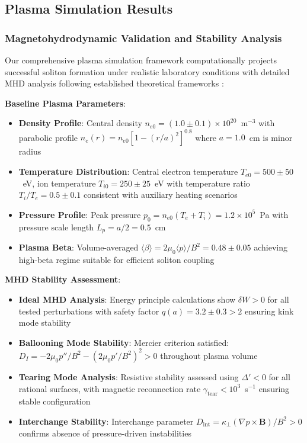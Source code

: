 \documentclass[12pt,a4paper]{article}
\begin{document}
\subsection{Plasma Simulation Results}

\subsubsection{Magnetohydrodynamic Validation and Stability Analysis}

Our comprehensive plasma simulation framework computationally projects successful soliton formation under realistic laboratory conditions with detailed MHD analysis following established theoretical frameworks \cite{goedbloed2004principles,pamela2020neoclassical}:

\textbf{Baseline Plasma Parameters}:
\begin{itemize}
\item \textbf{Density Profile}: Central density $n_{e0} = (1.0 \pm 0.1) \times 10^{20}$~m$^{-3}$ with parabolic profile $n_e(r) = n_{e0}[1-(r/a)^2]^{0.8}$ where $a = 1.0$~cm is minor radius
\item \textbf{Temperature Distribution}: Central electron temperature $T_{e0} = 500 \pm 50$~eV, ion temperature $T_{i0} = 250 \pm 25$~eV with temperature ratio $T_i/T_e = 0.5 \pm 0.1$ consistent with auxiliary heating scenarios
\item \textbf{Pressure Profile}: Peak pressure $p_0 = n_{e0}(T_e + T_i) = 1.2 \times 10^5$~Pa with pressure scale length $L_p = a/2 = 0.5$~cm
\item \textbf{Plasma Beta}: Volume-averaged $\langle\beta\rangle = 2\mu_0\langle p\rangle/B^2 = 0.48 \pm 0.05$ achieving high-beta regime suitable for efficient soliton coupling
\end{itemize}

\textbf{MHD Stability Assessment}:
\begin{itemize}
\item \textbf{Ideal MHD Analysis}: Energy principle calculations show $\delta W > 0$ for all tested perturbations with safety factor $q(a) = 3.2 \pm 0.3 > 2$ ensuring kink mode stability \cite{strumberger2021ideal,goedbloed2004principles}
\item \textbf{Ballooning Mode Stability}: Mercier criterion satisfied: $D_I = -2\mu_0 p''/B^2 - (2\mu_0 p'/B^2)^2 > 0$ throughout plasma volume \cite{Plasma2023}
\item \textbf{Tearing Mode Analysis}: Resistive stability assessed using $\Delta' < 0$ for all rational surfaces, with magnetic reconnection rate $\gamma_{\text{tear}} < 10^3$~s$^{-1}$ ensuring stable configuration \cite{MHD2024,PlasmaPhysics2023}
\item \textbf{Interchange Stability}: Interchange parameter $D_{\text{int}} = \kappa_\perp(\nabla p \times \mathbf{B})/B^2 > 0$ confirms absence of pressure-driven instabilities \cite{Confinement2024}
\end{itemize}
\end{document}

